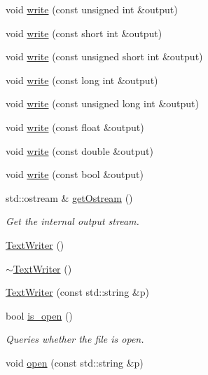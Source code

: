 \begin{DoxyCompactItemize}
\item 
void \mbox{\hyperlink{classENSEM_1_1TextWriter_aeca2b6ad3ab9353c98220345c8f8edfe}{write}} (const unsigned int \&output)
\item 
void \mbox{\hyperlink{classENSEM_1_1TextWriter_af8e02d2f0ce493c50698a7999af9596c}{write}} (const short int \&output)
\item 
void \mbox{\hyperlink{classENSEM_1_1TextWriter_a7c3f545361114dcb952b07151188c18c}{write}} (const unsigned short int \&output)
\item 
void \mbox{\hyperlink{classENSEM_1_1TextWriter_a2bf45b3cde030d81948d6b13e5c76437}{write}} (const long int \&output)
\item 
void \mbox{\hyperlink{classENSEM_1_1TextWriter_ab619ef20f83f064bddb2ba4e5ab2b9dc}{write}} (const unsigned long int \&output)
\item 
void \mbox{\hyperlink{classENSEM_1_1TextWriter_a7209fb322f222a9d7354a0b03bc2c61c}{write}} (const float \&output)
\item 
void \mbox{\hyperlink{classENSEM_1_1TextWriter_af276971ecba157a3867e53ec909e543f}{write}} (const double \&output)
\item 
void \mbox{\hyperlink{classENSEM_1_1TextWriter_a3e99ec247c2bd70e5b4361bbb0264daf}{write}} (const bool \&output)
\item 
std\+::ostream \& \mbox{\hyperlink{classENSEM_1_1TextWriter_a40ade2e6c44ba267efdce5fb70909362}{get\+Ostream}} ()
\begin{DoxyCompactList}\small\item\em Get the internal output stream. \end{DoxyCompactList}\item 
\mbox{\hyperlink{classENSEM_1_1TextWriter_ad0b4ad57a3e91011920a473244447cac}{Text\+Writer}} ()
\item 
\mbox{\hyperlink{classENSEM_1_1TextWriter_a2aa3ba4260c005b4a2910046448cc193}{$\sim$\+Text\+Writer}} ()
\item 
\mbox{\hyperlink{classENSEM_1_1TextWriter_abbaa16dfaccb062fc8cea4ce2abf3215}{Text\+Writer}} (const std\+::string \&p)
\item 
bool \mbox{\hyperlink{classENSEM_1_1TextWriter_a6718d81018fe6a709f11cdb2f008c68b}{is\+\_\+open}} ()
\begin{DoxyCompactList}\small\item\em Queries whether the file is open. \end{DoxyCompactList}\item 
void \mbox{\hyperlink{classENSEM_1_1TextWriter_a8a7bdd80e930dd002d3af693e5a2cb95}{open}} (const std\+::string \&p)

\end{DoxyCompactItemize}
